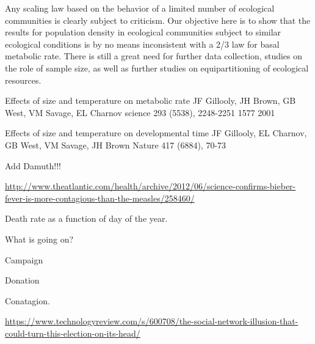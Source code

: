 \begin{frame}
Any scaling law based on the behavior of a limited number of ecological
communities is clearly subject to criticism.  Our objective here is
to show that the results for population density in ecological communities
subject to similar ecological conditions is by no means inconsistent
with a 2/3 law for basal metabolic rate.  There is still a great need
for further data collection, studies on the role of sample size\cite{woman},
as well as further studies on equipartitioning of ecological resources.

\end{frame}

\begin{frame}
  Effects of size and temperature on metabolic rate
JF Gillooly, JH Brown, GB West, VM Savage, EL Charnov
science 293 (5538), 2248-2251	1577	2001

Effects of size and temperature on developmental time
JF Gillooly, EL Charnov, GB West, VM Savage, JH Brown
Nature 417 (6884), 70-73
\end{frame}

\begin{frame}
  Add Damuth!!!

\end{frame}

\begin{frame}
  \url{http://www.theatlantic.com/health/archive/2012/06/science-confirms-bieber-fever-is-more-contagious-than-the-measles/258460/}
\end{frame}

\begin{frame}
  Death rate as a function of day of the year.

  What is going on?
\end{frame}

\begin{frame}
  Campaign 

  Donation

  Conatagion.

\url{https://www.technologyreview.com/s/600708/the-social-network-illusion-that-could-turn-this-election-on-its-head/}


\end{frame}


